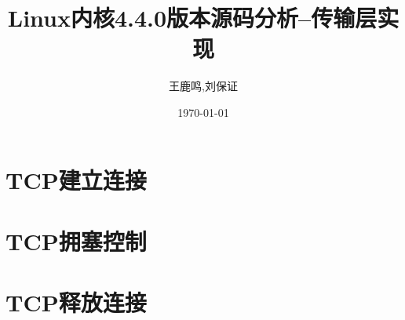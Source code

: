 \documentclass[11pt, a4paper,oneside]{book}
\theoremstyle{ocrenumbox}
\theoremstyle{purplenumbox}
\theoremstyle{blackbox}
\begin{document}
\pagestyle{empty} %
\title{Linux内核4.4.0版本源码分析--传输层实现}
\author{王鹿鸣,刘保证}
\date{\today}
\maketitle
\setcounter{secnumdepth}{3}
\frontmatter
\tableofcontents

\mainmatter
\pagestyle{fancy}







\chapter{TCP建立连接}
\minitoc
    
    


\chapter{TCP拥塞控制}
\minitoc



\chapter{TCP释放连接}
\minitoc





\end{document}

